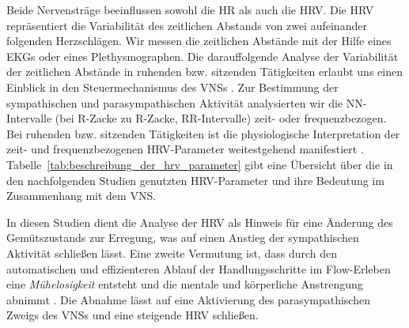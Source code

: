 Beide Nervensträge beeinflussen sowohl die \ac{HR} als auch die \ac{HRV}. Die \ac{HRV} repräsentiert die Variabilität des zeitlichen Abstands von zwei aufeinander folgenden Herzschlägen. Wir messen die zeitlichen Abstände mit der Hilfe eines \ac{EKG}s oder eines Plethysmographen. Die darauffolgende Analyse der Variabilität der zeitlichen Abstände in ruhenden bzw. sitzenden Tätigkeiten erlaubt uns einen Einblick in den Steuermechanismus des \ac{VNS}s \citep{Jalife1983}. Zur Bestimmung der sympathischen und parasympathischen Aktivität analysierten wir die NN-Intervalle (bei R-Zacke zu R-Zacke, RR-Intervalle) zeit- oder frequenzbezogen. Bei ruhenden bzw. sitzenden Tätigkeiten ist die physiologische Interpretation der zeit- und frequenzbezogenen \ac{HRV}-Parameter weitestgehend manifestiert \citep[][S.~360]{TaskForce1996}. Tabelle~\ref{tab:beschreibung_der_hrv_parameter} gibt eine Übersicht über die in den nachfolgenden Studien genutzten \ac{HRV}-Parameter und ihre Bedeutung im Zusammenhang mit dem \ac{VNS}. 

In diesen Studien dient die Analyse der \ac{HRV} als Hinweis für eine Änderung des Gemütszustands zur Erregung, was auf einen Anstieg der sympathischen Aktivität schließen lässt. Eine zweite Vermutung ist, dass durch den automatischen und effizienteren Ablauf der Handlungsschritte im Flow-Erleben eine \emph{Mühelosigkeit} entsteht und die mentale und körperliche Anstrengung abnimmt \citep[][S.~308]{deManzano2010}. Die Abnahme lässt auf eine Aktivierung des parasympathischen Zweigs des \ac{VNS}s und eine steigende \ac{HRV} schließen. 

